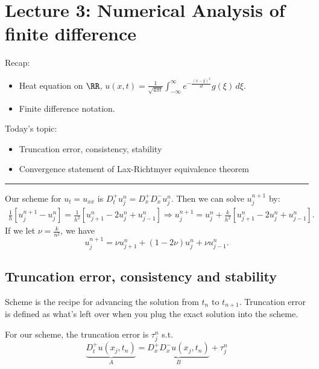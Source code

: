 \newpage 
\section{Lecture 3: Numerical Analysis of finite difference} 
Recap: 
\begin{itemize}
    \item Heat equation on $\RR$, $u(x,t) = \frac{1}{\sqrt{4\pi t} }\int_{-\infty}^{\infty} e^{-\frac{(x-\xi)^2}{4t} }g(\xi) \, d\xi $.  
    \item Finite difference notation. 
\end{itemize}
Today's topic: 
\begin{itemize}
    \item Truncation error, consistency, stability 
    \item Convergence statement of Lax-Richtmyer equivalence theorem 
\end{itemize}

\vspace{1em}
\hrule 
\vspace{1em}

Our scheme for $u_t = u_{ xx } $ is $D_t^{+} u_j^n=D_x^{+} D_x^{-} u_j^n$. Then we can solve $u_j^{n+1}$ by: 
\begin{align*}
    \frac{1}{h}\left[u_j^{n+1}-u_j^n\right]=\frac{1}{h^2}\left[u_{j+1}^n-2 u_j^n+u_{j-1}^n\right] \Rightarrow u_j^{n+1}=u_j^n+\frac{k}{h^2}\left[u_{j+1}^n-2 u_j^n+u_{j-1}^n\right]. 
\end{align*}
If we let $ \nu = \frac{k}{n^2} $, we have 
\[
    u_j^{n+1}= \nu  u_{j+1}^n+(1-2 \nu ) u_j^n+ \nu  u_{j-1}^n. 
\]


\subsection{Truncation error, consistency and stability}
\begin{definition}
\label{def: Scheme and truncation error}
Scheme is the recipe for advancing the solution from $t_n$ to $t_{n+1}$. Truncation error is defined as what's left over when you plug the exact solution into the scheme. 
\end{definition}
For our scheme, the truncation error is $ \tau_j^n$ s.t. 
\[
    \underbrace{D_{t}^{+} u\left(x_j, t_n\right)}_A=\underbrace{D_x^{+} D_x^{-} u\left(x_j, t_n\right)}_B+\tau_j^n
\]


